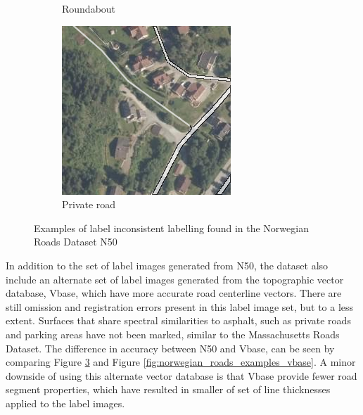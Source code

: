 \begin{figure}[h]
\begin{subfigure}{0.31\textwidth}
\caption{Roundabout} \label{fig:norwegian_roads_roundabout_n50}
\end{subfigure}
\hspace*{\fill} %
\begin{subfigure}{0.31\textwidth}
\includegraphics[width=\linewidth]{figs/datasets/nor_examples/1157_missing_n50.png}
\caption{Private road} \label{fig:norwegian_roads_missing_n50}
\end{subfigure}
\hspace*{\fill} %
\caption{Examples of label inconsistent labelling found in the Norwegian Roads Dataset N50} \label{fig:norwegian_roads_examples_n50}
\end{figure}

In addition to the set of label images generated from N50, the dataset also include an alternate set of label images generated from the topographic vector database, Vbase, which have more accurate road centerline vectors. There are still omission and registration errors present in this label image set, but to a less extent. Surfaces that share spectral similarities to asphalt, such as private roads and parking areas have not been marked, similar to the Massachusetts Roads Dataset. The difference in accuracy between N50 and Vbase, can be seen by comparing Figure \ref{fig:norwegian_roads_examples_n50} and Figure \ref{fig:norwegian_roads_examples_vbase}. A minor downside of using this alternate vector database is that Vbase provide fewer road segment properties, which have resulted in smaller of set of line thicknesses applied to the label images.\\

